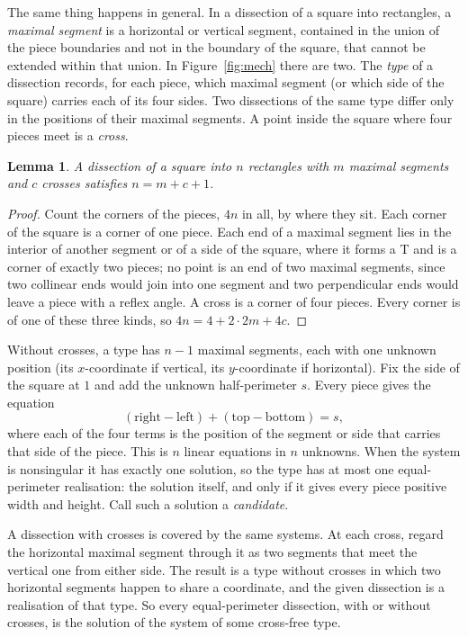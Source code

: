 \documentclass[11pt]{article}
\newtheorem{lemma}{Lemma}
\begin{document}
The same thing happens in general. In a dissection of a square into rectangles, a \emph{maximal segment} is a horizontal or vertical segment, contained in the union of the piece boundaries and not in the boundary of the square, that cannot be extended within that union. In Figure~\ref{fig:mech} there are two. The \emph{type} of a dissection records, for each piece, which maximal segment (or which side of the square) carries each of its four sides. Two dissections of the same type differ only in the positions of their maximal segments. A point inside the square where four pieces meet is a \emph{cross}.

\begin{lemma}\label{lem:count}
A dissection of a square into $n$ rectangles with $m$ maximal segments and $c$ crosses satisfies $n=m+c+1$.
\end{lemma}

\begin{proof}
Count the corners of the pieces, $4n$ in all, by where they sit. Each corner of the square is a corner of one piece. Each end of a maximal segment lies in the interior of another segment or of a side of the square, where it forms a T and is a corner of exactly two pieces; no point is an end of two maximal segments, since two collinear ends would join into one segment and two perpendicular ends would leave a piece with a reflex angle. A cross is a corner of four pieces. Every corner is of one of these three kinds, so $4n=4+2\cdot 2m+4c$.
\end{proof}

Without crosses, a type has $n-1$ maximal segments, each with one unknown position (its $x$-coordinate if vertical, its $y$-coordinate if horizontal). Fix the side of the square at $1$ and add the unknown half-perimeter $s$. Every piece gives the equation
\[
(\text{right} - \text{left}) + (\text{top} - \text{bottom}) = s ,
\]
where each of the four terms is the position of the segment or side that carries that side of the piece. This is $n$ linear equations in $n$ unknowns. When the system is nonsingular it has exactly one solution, so the type has at most one equal-perimeter realisation: the solution itself, and only if it gives every piece positive width and height. Call such a solution a \emph{candidate}.

A dissection with crosses is covered by the same systems. At each cross, regard the horizontal maximal segment through it as two segments that meet the vertical one from either side. The result is a type without crosses in which two horizontal segments happen to share a coordinate, and the given dissection is a realisation of that type. So every equal-perimeter dissection, with or without crosses, is the solution of the system of some cross-free type.
\end{document}
